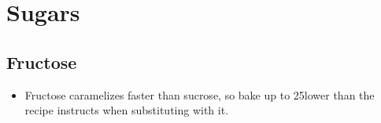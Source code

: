 
\section{Sugars}
\subsection{Fructose}
\begin{itemize}
\item Fructose caramelizes faster than sucrose, so bake up to 25\degF lower
  than the recipe instructs when substituting with it.
\end{itemize}

